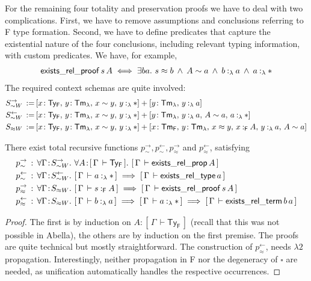 \documentclass[a4paper,UKenglish]{lipics-v2016}
\newcommand{\ms}{\,}
\newcommand{\mrel}[1]{\mathrel{\ms #1 \ms}}
\newcommand{\OF}{\mrel{:}}
\newcommand{\mAnd}{\mrel{\wedge}}
\newcommand{\mAll}[1]{\ensuremath{\forall} #1.\ms\ms}
\newcommand{\mEx}[1]{\ensuremath{\exists} #1.\ms\ms}
\newcommand{\eqdef}{\mrel{:=}}
\newcommand{\SysL}{$\lambda2$\xspace}
\newcommand{\TyF}{\ensuremath{\mathsf{Ty_{F}}}}
\newcommand{\TmF}{\ensuremath{\mathsf{Tm_{F}}}}
\newcommand{\TmL}{\ensuremath{\mathsf{Tm_{\lambda}}}}
\newcommand{\of}{\ensuremath{\!:\!}}
\newcommand{\typingFh}[2]{\ensuremath{#1 \mathbin{:_{\mathsf{F}}} #2}}
\newcommand{\typingLh}[2]{\ensuremath{#1 \mathbin{:_{\lambda}} #2}}
\newcommand{\tyr}{\mathrel{\sim}}
\newcommand{\tmr}{\mathrel{\approx}}
\newcommand{\Prp}{\ensuremath{\textrm{\textasteriskcentered}}}
\newcommand{\Typ}{\ensuremath{\square}}
\newcommand{\bc}[2]{\ensuremath{[\,#1\,\vdash #2\,]}}
\newcommand{\sof}{\ensuremath{\!:}}
\newcommand{\ssep}{\ensuremath{,\ms}}
\theoremstyle{plain}
\begin{document}
For the remaining four totality and preservation proofs we have to deal with two complications.
First, we have to remove assumptions and conclusions referring to F type formation.
Second, we have to define predicates that capture the existential nature of the four conclusions, including relevant typing information, with custom predicates.
We have, for example,
\begin{align*}
  \mathsf{exists\_rel\_proof}\,s\,A \iff \mEx{ba} s \tmr b \mAnd A \tyr a \mAnd \typingLh{b}{a} \mAnd \typingLh{a}{\Prp}
\end{align*}
The required context schemas are quite involved:
\begin{align*}
  S_{\tyr W}^{\rightarrow} \eqdef &[x\sof\TyF \ssep y\sof\TmL \ssep x \tyr y \ssep \typingLh{y}{\Prp}] + [y\sof\TmL \ssep \typingLh{y}{a}]\\
  S_{\tyr W}^{\leftarrow} \eqdef &[x\sof\TyF \ssep y\sof\TmL \ssep x \tyr y \ssep \typingLh{y}{\Prp}] + [y\sof\TmL \ssep \typingLh{y}{a} \ssep A \tyr a \ssep \typingLh{a}{\Prp}]\\
  S_{\tmr W} \eqdef &[x\sof\TyF \ssep y\sof\TmL \ssep x \tyr y \ssep \typingLh{y}{\Prp}] + [x\sof\TmF \ssep y\sof\TmL \ssep x \tmr y \ssep \typingFh{x}{A} \ssep \typingLh{y}{a} \ssep A \tyr a]
\end{align*}
\begin{lemma}
  There exist total recursive functions $p^{\rightarrow}_{\tyr},p^{\leftarrow}_{\tyr},p^{\rightarrow}_{\tmr}$ and $p^{\leftarrow}_{\tmr}$, satisfying
  \begin{align*}
    p^{\rightarrow}_{\tyr} &\OF  \mAll{\Gamma \of S_{\tyr W}^{\rightarrow}} \mAll{A \of \bc{\Gamma}{\TyF}} \bc{\Gamma}{\mathsf{exists\_rel\_prop}\,A}\\
    p^{\leftarrow}_{\tyr} &\OF \mAll{\Gamma \of S_{\tyr W}^{\leftarrow}} \bc{\Gamma}{\typingLh{a}{\Prp}} \implies \bc{\Gamma}{\mathsf{exists\_rel\_type}\,a}\\
    p^{\rightarrow}_{\tmr} &\OF \mAll{\Gamma \of S_{\tmr W}} \bc{\Gamma}{\typingFh{s}{A}} \implies \bc{\Gamma}{\mathsf{exists\_rel\_proof}\,s\,A}\\
    p^{\leftarrow}_{\tmr} &\OF \mAll{\Gamma \of S_{\tmr W}} \bc{\Gamma}{\typingLh{b}{a}} \implies \bc{\Gamma}{\typingLh{a}{\Prp}} \implies \bc{\Gamma}{\mathsf{exists\_rel\_term}\,b\,a}
  \end{align*}
\end{lemma}
\begin{proof}
  The first is by induction on $A \of \bc{\Gamma}{\TyF}$ (recall that this was not possible in Abella), the others are by induction on the first premise.
  The proofs are quite technical but mostly straightforward.
  The construction of $p^{\leftarrow}_{\tmr}$, needs \SysL propagation.
  Interestingly, neither propagation in F nor the degeneracy of $\Typ$ are needed, as unification automatically handles the respective occurrences.
\end{proof}
\end{document}
